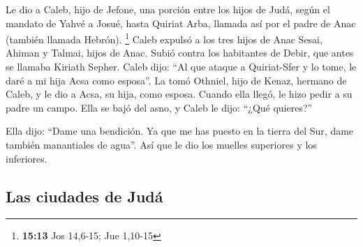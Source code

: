  Le dio a Caleb, hijo de Jefone, una porción entre los
hijos de Judá, según el mandato de Yahvé a Josué, hasta Quiriat Arba,
llamada así por el padre de Anac (también llamada Hebrón). \footnote{\textbf{15:13}
  Jos 14,6-15; Jue 1,10-15}  Caleb expulsó a los tres
hijos de Anac Sesai, Ahiman y Talmai, hijos de Anac. 
Subió contra los habitantes de Debir, que antes se llamaba Kiriath
Sepher.  Caleb dijo: ``Al que ataque a Quiriat-Sfer y lo
tome, le daré a mi hija Acsa como esposa''.  La tomó
Othniel, hijo de Kenaz, hermano de Caleb, y le dio a Acsa, su hija, como
esposa.  Cuando ella llegó, le hizo pedir a su padre un
campo. Ella se bajó del asno, y Caleb le dijo: ``¿Qué quieres?''

 Ella dijo: ``Dame una bendición. Ya que me has puesto en
la tierra del Sur, dame también manantiales de agua''. Así que le dio
los muelles superiores y los inferiores.

\hypertarget{las-ciudades-de-juduxe1}{%
\subsection{Las ciudades de Judá}\label{las-ciudades-de-juduxe1}}

